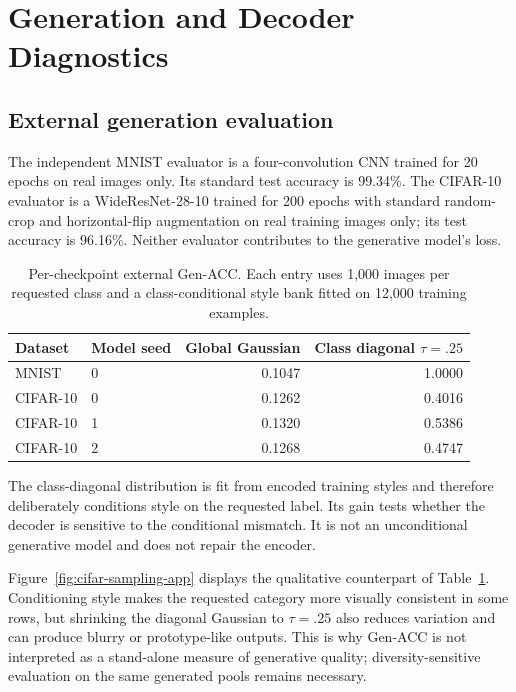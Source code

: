 \FloatBarrier

\section{Generation and Decoder Diagnostics}
\label{app:decoder}

\subsection{External generation evaluation}

The independent MNIST evaluator is a four-convolution CNN trained for 20
epochs on real images only.  Its standard test accuracy is 99.34\%.  The
CIFAR-10 evaluator is a WideResNet-28-10 trained for 200 epochs with standard
random-crop and horizontal-flip augmentation on real training images only;
its test accuracy is 96.16\%.  Neither evaluator contributes to the
generative model's loss.

\begin{table}[ht]
\caption{Per-checkpoint external Gen-ACC.  Each entry uses 1,000 images per
requested class and a class-conditional style bank fitted on 12,000 training
examples.}
\label{tab:generation-seeds}
\centering
\small
\begin{tabular}{llrr}
\toprule
Dataset & Model seed & Global Gaussian & Class diagonal $\tau=.25$ \\
\midrule
MNIST & 0 & 0.1047 & 1.0000 \\
CIFAR-10 & 0 & 0.1262 & 0.4016 \\
CIFAR-10 & 1 & 0.1320 & 0.5386 \\
CIFAR-10 & 2 & 0.1268 & 0.4747 \\
\bottomrule
\end{tabular}
\end{table}

The class-diagonal distribution is fit from encoded training styles and
therefore deliberately conditions style on the requested label.  Its gain
tests whether the decoder is sensitive to the conditional mismatch.  It is
not an unconditional generative model and does not repair the encoder.

Figure~\ref{fig:cifar-sampling-app} displays the qualitative counterpart of
Table~\ref{tab:generation-seeds}.  Conditioning style makes the requested
category more visually consistent in some rows, but shrinking the diagonal
Gaussian to $\tau=.25$ also reduces variation and can produce blurry or
prototype-like outputs.  This is why Gen-ACC is not interpreted as a
stand-alone measure of generative quality; diversity-sensitive evaluation on
the same generated pools remains necessary.

